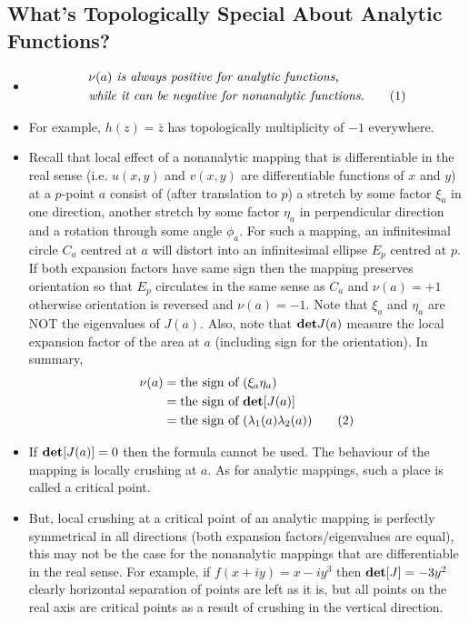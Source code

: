 \documentclass[12pt]{article}
\newcommand\numberthis{\addtocounter{equation}{1}\tag{\theequation}}
\def\tt{\textit}
\def\mf{\ensuremath\mathbf}
\def\det{\ensuremath\mf{det}}
\begin{document}
\subsection{What's Topologically Special About Analytic Functions?}
\begin{itemize}
    \item 
    \begin{align*}
        &\tt{$\nu(a)$ is always positive for analytic functions,}\\
        &\tt{while it can be negative for nonanalytic functions.} \numberthis \label{e8}
    \end{align*}
    \item For example, $h(z)=\bar{z}$ has topologically multiplicity of $-1$ everywhere.
    \item Recall that local effect of a nonanalytic mapping that is differentiable in the real sense (i.e. $u(x,y)$ and $v(x,y)$ are differentiable functions of $x$ and $y$) at a $p$-point $a$ consist of (after translation to $p$) a stretch by some factor $\xi_a$ in one direction, another stretch by some factor $\eta_a$ in perpendicular direction and a rotation through some angle $\phi_a$. For such a mapping, an infinitesimal circle $C_a$ centred at $a$ will distort into an infinitesimal ellipse $E_p$ centred at $p$. If both expansion factors have same sign then the mapping preserves orientation so that $E_p$ circulates in the same sense as $C_a$ and $\nu(a) = +1$ otherwise orientation is reversed and $\nu(a)=-1$. Note that $\xi_a$ and $\eta_a$ are NOT the eigenvalues of $J(a)$. Also, note that $\det J(a)$ measure the local expansion factor of the area at $a$ (including sign for the orientation). In summary,
    \begin{align*}
        \nu(a) &= \text{the sign of } (\xi_a\eta_a)\\ 
        &= \text{the sign of } \det[J(a)]\\
        &= \text{the sign of } (\lambda_1(a)\lambda_2(a)) \numberthis \label{e9}
    \end{align*}
    \item If $\det[J(a)]=0$ then the formula cannot be used. The behaviour of the mapping is locally crushing at $a$. As for analytic mappings, such a place is called a critical point.
    \item But, local crushing at a critical point of an analytic mapping is perfectly symmetrical in all directions (both expansion factors/eigenvalues are equal), this may not be the case for the nonanalytic mappings that are differentiable in the real sense. For example, if $f(x+iy)=x-iy^3$ then $\det[J]=-3y^2$ clearly horizontal separation of points are left as it is, but all points on the real axis are critical points as a result of crushing in the vertical direction.

\end{itemize}
\end{document}

